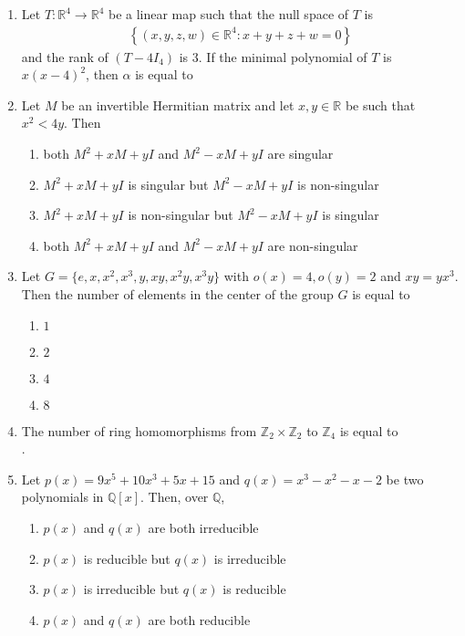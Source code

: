 \documentclass[journal]{IEEEtran}
\numberwithin{equation}{enumi}
\numberwithin{figure}{enumi}
\begin{document}
\begin{enumerate}
\item Let $T : \mathbb{R}^4 \to \mathbb{R}^4$ be a linear map such that the null space of $T$ is
\begin{align*}
\left\{ (x, y, z, w) \in \mathbb{R}^4 : x+y+z+w = 0 \right\}
\end{align*}
and the rank of $(T - 4I_4)$ is $3$. If the minimal polynomial of $T$ is $x(x - 4)^2$, then $\alpha$ is equal to \underline{\hspace{2cm}}
\hfill{}
\vspace{1em}

\item Let $M$ be an invertible Hermitian matrix and let $x, y \in \mathbb{R}$ be such that $x^2 < 4y$. Then
\hfill{}
\begin{enumerate}
     \item both $M^2 + xM + yI$ and $M^2 - xM + yI$ are singular
     \item  $M^2 + xM + yI$ is singular but $M^2 - xM + yI$ is non-singular
     \item  $M^2 + xM + yI$ is non-singular but $M^2 - xM + yI$ is singular
     \item  both $M^2 + xM + yI$ and $M^2 - xM + yI$ are non-singular
\end{enumerate}

\item Let $G = \{e, x, x^2, x^3, y, xy, x^2y, x^3y \}$ with $o(x) = 4, o(y) = 2$ and $xy = yx^3$. Then the number of elements in the center of the group $G$ is equal to
\hfill{}
\begin{multicols}{4}
\begin{enumerate}
    \item $1$
    \item $2$
    \item $4$
    \item $8$
\end{enumerate}
\end{multicols}

\item The number of ring homomorphisms from $\mathbb{Z}_2 \times \mathbb{Z}_2$ to $\mathbb{Z}_4$ is equal to \underline{\hspace{2cm}}\\
. \hfill{}

\item Let $p(x) = 9x^5 + 10x^3 + 5x + 15$ and $q(x) = x^3 - x^2 - x - 2$ be two polynomials in $\mathbb{Q}[x]$. Then, over $\mathbb{Q}$,
\hfill{}
\begin{enumerate}
    \item  $p(x)$ and $q(x)$ are both irreducible
    \item  $p(x)$ is reducible but $q(x)$ is irreducible
    \item  $p(x)$ is irreducible but $q(x)$ is reducible
    \item  $p(x)$ and $q(x)$ are both reducible
\end{enumerate}


\end{enumerate}
\end{document}

